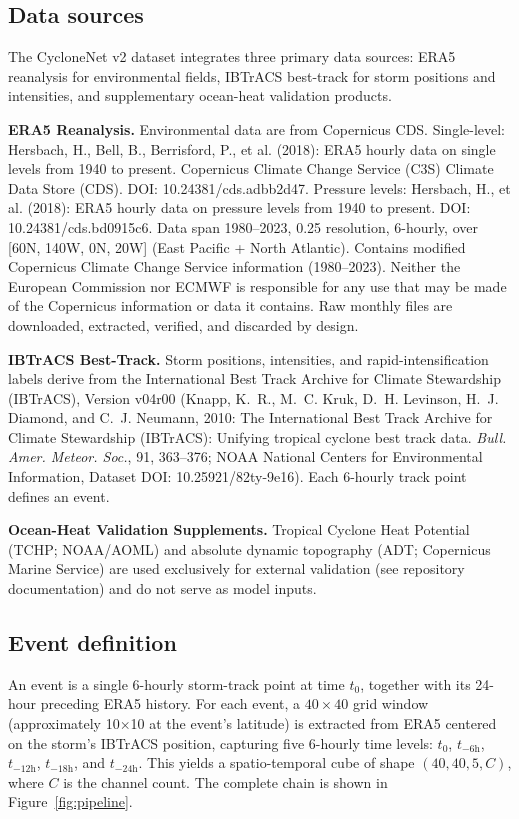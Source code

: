 \documentclass[11pt]{article}
\begin{document}
\subsection{Data sources}

The CycloneNet v2 dataset integrates three primary data sources: ERA5
reanalysis for environmental fields, IBTrACS best-track for storm positions
and intensities, and supplementary ocean-heat validation products.

\textbf{ERA5 Reanalysis.} Environmental data are from Copernicus CDS.
Single-level: Hersbach, H., Bell, B., Berrisford, P., et al. (2018): ERA5
hourly data on single levels from 1940 to present. Copernicus Climate Change
Service (C3S) Climate Data Store (CDS). DOI: 10.24381/cds.adbb2d47. Pressure
levels: Hersbach, H., et al. (2018): ERA5 hourly data on pressure levels from
1940 to present. DOI: 10.24381/cds.bd0915c6. Data span 1980--2023,
0.25\textdegree{} resolution, 6-hourly, over [60\textdegree N,
140\textdegree W, 0\textdegree N, 20\textdegree W] (East Pacific + North
Atlantic). Contains modified Copernicus Climate Change Service information
(1980--2023). Neither the European Commission nor ECMWF is responsible for any
use that may be made of the Copernicus information or data it contains. Raw
monthly files are downloaded, extracted, verified, and discarded by design.

\textbf{IBTrACS Best-Track.} Storm positions, intensities, and
rapid-intensification labels derive from the International Best Track Archive
for Climate Stewardship (IBTrACS), Version v04r00 (Knapp, K.~R., M.~C. Kruk,
D.~H. Levinson, H.~J. Diamond, and C.~J. Neumann, 2010: The International Best
Track Archive for Climate Stewardship (IBTrACS): Unifying tropical cyclone
best track data. \emph{Bull. Amer. Meteor. Soc.}, 91, 363--376; NOAA National
Centers for Environmental Information, Dataset DOI: 10.25921/82ty-9e16). Each
6-hourly track point defines an event.

\textbf{Ocean-Heat Validation Supplements.} Tropical Cyclone Heat Potential
(TCHP; NOAA/AOML) and absolute dynamic topography (ADT; Copernicus Marine
Service) are used exclusively for external validation (see repository
documentation) and do not serve as model inputs.

\subsection{Event definition}

An event is a single 6-hourly storm-track point at time $t_0$, together with
its 24-hour preceding ERA5 history. For each event, a $40\times40$ grid window
(approximately 10\textdegree$\times$10\textdegree{} at the event's latitude)
is extracted from ERA5 centered on the storm's IBTrACS position, capturing five
6-hourly time levels: $t_0$, $t_{-6\mathrm{h}}$, $t_{-12\mathrm{h}}$,
$t_{-18\mathrm{h}}$, and $t_{-24\mathrm{h}}$. This yields a spatio-temporal
cube of shape $(40, 40, 5, C)$, where $C$ is the channel count. The complete
chain is shown in Figure~\ref{fig:pipeline}.
\end{document}

